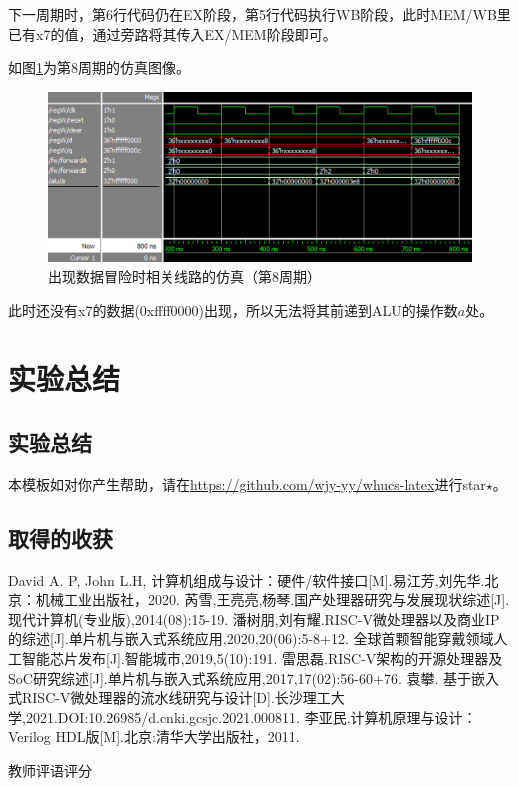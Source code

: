 \documentclass[UTF8,a4paper,autofakebold,15pt]{ctexart}
\begin{document}
下一周期时，第6行代码仍在EX阶段，第5行代码执行WB阶段，此时MEM/WB里已有x7的值，通过旁路将其传入EX/MEM阶段即可。

{\color{red}{注意下一行“图”后面的数字可以点击。}}

如图\ref{fig:label10}为第8周期的仿真图像。

\begin{figure}
	\centering
	\includegraphics[scale=.8]{fig10.png}
	\caption{出现数据冒险时相关线路的仿真（第8周期）}
	\label{fig:label10}
\end{figure}

此时还没有x7的数据(0xffff0000)出现，所以无法将其前递到ALU的操作数$a$处。

\section{实验总结}
\subsection{实验总结}

本模板如对你产生帮助，请在\href{https://github.com/wjy-yy/whucs-latex}{https://github.com/wjy-yy/whucs-latex}进行star$\star$。


	
\subsection{取得的收获}
	
\newpage
\begin{thebibliography}{99}  
	
	David A. P, John L.H, 计算机组成与设计：硬件/软件接口[M].易江芳,刘先华.北京：机械工业出版社，2020.
	芮雪,王亮亮,杨琴.国产处理器研究与发展现状综述[J].现代计算机(专业版),2014(08):15-19.
	潘树朋,刘有耀.RISC-V微处理器以及商业IP的综述[J].单片机与嵌入式系统应用,2020,20(06):5-8+12.
	全球首颗智能穿戴领域人工智能芯片发布[J].智能城市,2019,5(10):191.
	雷思磊.RISC-V架构的开源处理器及SoC研究综述[J].单片机与嵌入式系统应用,2017,17(02):56-60+76.
	袁攀. 基于嵌入式RISC-V微处理器的流水线研究与设计[D].长沙理工大学,2021.DOI:10.26985/d.cnki.gcsjc.2021.000811.
	李亚民.计算机原理与设计：Verilog HDL版[M].北京:清华大学出版社，2011.
	
\end{thebibliography}
\newpage
\begin{center}
	 教师评语评分
\end{center}
\end{document}
